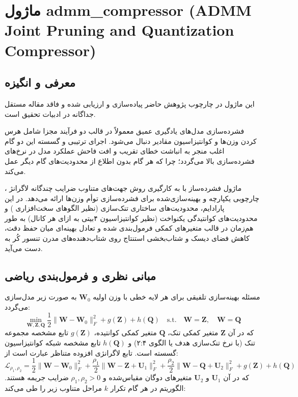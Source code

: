 \section{ماژول admm\_compressor (ADMM Joint Pruning and Quantization Compressor)}
\label{sec:module_admm_compressor}

\subsection{معرفی و انگیزه}
این ماژول در چارچوب پژوهش حاضر پیاده‌سازی و ارزیابی شده و فاقد مقاله مستقل جداگانه در ادبیات تحقیق است.

فشرده‌سازی مدل‌های یادگیری عمیق معمولاً در قالب دو فرآیند مجزا شامل هرس کردن وزن‌ها  و کوانتیزاسیون مقادیر  دنبال می‌شود. اجرای ترتیبی و گسسته این دو گام اغلب منجر به انباشت خطای تقریب و افت فاحش عملکرد مدل در نرخ‌های فشرده‌سازی بالا می‌گردد؛ چرا که هر گام بدون اطلاع از محدودیت‌های گام دیگر عمل می‌کند.

ماژول فشرده‌ساز  با به کارگیری روش جهت‌های متناوب ضرایب چندگانه لاگرانژ ، چارچوبی یکپارچه و بهینه‌سازی‌شده برای فشرده‌سازی توأم وزن‌ها ارائه می‌دهد. در این پارادایم، محدودیت‌های ساختاری تنک‌سازی (نظیر الگوهای سخت‌افزاری ) و محدودیت‌های کوانتیدگی یکنواخت (نظیر کوانتیزاسیون ۴بیتی به ازای هر کانال) به طور هم‌زمان در قالب متغیرهای کمکی فرمول‌بندی شده و تعادل بهینه‌ای میان حفظ دقت، کاهش فضای دیسک و شتاب‌بخشی استنتاج روی شتاب‌دهنده‌های مدرن تنسور کُر  به دست می‌آید.

\subsection{مبانی نظری و فرمول‌بندی ریاضی}
مسئله بهینه‌سازی تلفیقی برای هر لایه خطی با وزن اولیه $\mathbf{W}_0$ به صورت زیر مدل‌سازی می‌گردد:
\begin{equation}
\min_{\mathbf{W}, \mathbf{Z}, \mathbf{Q}} \frac{1}{2} \|\mathbf{W} - \mathbf{W}_0\|_F^2 + g(\mathbf{Z}) + h(\mathbf{Q}) \quad \text{s.t.} \quad \mathbf{W} = \mathbf{Z}, \quad \mathbf{W} = \mathbf{Q}
\end{equation}
که در آن $\mathbf{Z}$ متغیر کمکی تنک، $\mathbf{Q}$ متغیر کمکی کوانتیده، $g(\mathbf{Z})$ تابع مشخصه مجموعه تنک (با نرخ تنک‌سازی هدف یا الگوی ۲:۴) و $h(\mathbf{Q})$ تابع مشخصه شبکه کوانتیزاسیون گسسته است. تابع لاگرانژی افزوده  متناظر عبارت است از:
\begin{equation}
\mathcal{L}_{\rho_1, \rho_2} = \frac{1}{2} \|\mathbf{W} - \mathbf{W}_0\|_F^2 + \frac{\rho_1}{2} \|\mathbf{W} - \mathbf{Z} + \mathbf{U}_1\|_F^2 + \frac{\rho_2}{2} \|\mathbf{W} - \mathbf{Q} + \mathbf{U}_2\|_F^2 + g(\mathbf{Z}) + h(\mathbf{Q})
\end{equation}
که در آن $\mathbf{U}_1$ و $\mathbf{U}_2$ متغیرهای دوگان مقیاس‌شده و $\rho_1, \rho_2 > 0$ ضرایب جریمه هستند. الگوریتم در هر گام تکرار $k$ مراحل متناوب زیر را طی می‌کند:

